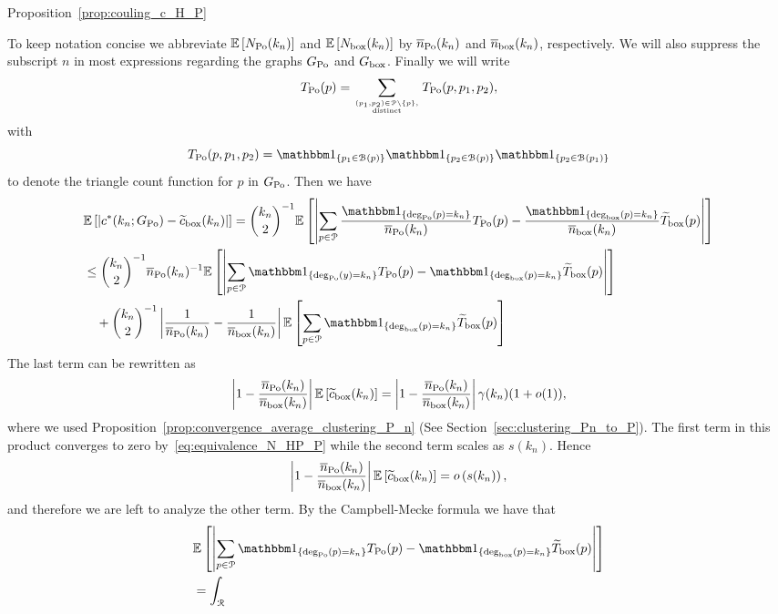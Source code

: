 \begin{proofof}{Proposition~\ref{prop:couling_c_H_P}}

To keep notation concise we abbreviate $\mathbb{E}\left[N_{{\mathrm{Po}}}(k_n)\right]$ and $\mathbb{E}\left[N_{\text{box}}(k_n)\right]$ by $\overline{n}_{{\mathrm{Po}}}(k_n)$ and $\overline{n}_{\mathrm{box}}(k_n)$, respectively. We will also suppress the subscript $n$ in most expressions regarding the graphs $G_{{\mathrm{Po}}}$ and $G_{\mathrm{box}}$. Finally we will write 
\[
	T_{{\mathrm{Po}}}(p) = \sum_{(p_1, p_2) \in {\mathcal P} \setminus \{p\}, \atop \text{distinct}} T_{{\mathrm{Po}}}(p,p_1,p_2),
\] 
with
\[
	T_{\Po}(p,p_1,p_2) = \ind{p_1 \in \BallHyp{p}} \ind{p_2 \in \BallHyp{p}} \ind{p_2 \in \BallHyp{p_1}}
\]
to denote the triangle count function for $p$ in $G_{{\mathrm{Po}}}$. Then we have
\begin{align*} 
	&\Exp{\left|  c^\ast(k_n; \GPo) - \widetilde{c}_{\text{box}}(k_n)\right|}= 
	\binom{k_n}{2}^{-1}\Exp{\left|\sum_{p \in \Pcal} 
    	\frac{\ind{\mathrm{deg}_{\Po}(p) = k_n}}{\expH} T_{\Po}(p)
        - \frac{\ind{\mathrm{deg}_{\mathrm{box}}(p) = k_n}}{\expP}  \widetilde{T}_{\mathrm{box}}(p)\right|} \\
    &\le\binom{k_n}{2}^{-1} \expH^{-1} \Exp{\left|\sum_{p \in \Pcal} \ind{\mathrm{deg}_{\Po}(y) = k_n} T_{\Po}(p) 
    	- \ind{\mathrm{deg}_{\mathrm{box}}(p) = k_n} \widetilde{T}_{\text{box}}(p)\right|} \\
    &\hspace{10pt}+ \binom{k_n}{2}^{-1} \left|\frac{1}{\expH} - \frac{1}{\expP}\right|\Exp{
        	\sum_{p \in \Pcal} \ind{\mathrm{deg}_{\mathrm{box}}(p) = k_n} \widetilde{T}_{\text{box}}(p) }
\end{align*}
The last term can be rewritten as
\begin{align*}
	\left|1 - \frac{\overline{n}_{{\mathrm{Po}}}(k_n)}{\overline{n}_{\mathrm{box}}(k_n)}\right| \mathbb{E}\left[\widetilde{c}_{\text{box}}(k_n)\right] = \left|1 - \frac{\overline{n}_{{\mathrm{Po}}}(k_n)}{\overline{n}_{\mathrm{box}}(k_n)}\right|\gamma(k_n)(1+o(1)),
\end{align*}
where we used Proposition~\ref{prop:convergence_average_clustering_P_n} (See Section~\ref{sec:clustering_Pn_to_P}). The first term in this product converges to zero by~\eqref{eq:equivalence_N_HP_P} while the second term scales as $s(k_n)$. Hence
\[
	\left|1 - \frac{\overline{n}_{{\mathrm{Po}}}(k_n)}{\overline{n}_{\mathrm{box}}(k_n)}\right| \mathbb{E}\left[\widetilde{c}_{\text{box}}(k_n)\right] = o\left(s(k_n)\right),
\]
and therefore we are left to analyze the other term. By the Campbell-Mecke formula we have that
\begin{align*}
	    &\Exp{\left|\sum_{p \in \Pcal} \ind{\mathrm{deg}_{\Po}(p) = k_n} T_{\Po}(p) 
	        	- \ind{\mathrm{deg}_{\mathrm{box}}(p) = k_n} \widetilde{T}_{\text{box}}(p)\right|} \\
	    &= \int_{\Rcal} 

\end{align*}
\end{proofof}
